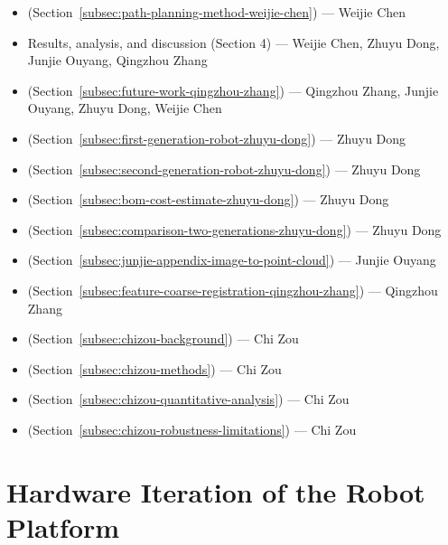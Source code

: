 \documentclass[12pt]{interim_report}
\begin{document}
\begin{itemize}
    \item {} (Section~\ref{subsec:path-planning-method-weijie-chen}) --- Weijie Chen
    \item Results, analysis, and discussion (Section 4) --- Weijie Chen, Zhuyu Dong, Junjie Ouyang, Qingzhou Zhang
    \item {} (Section~\ref{subsec:future-work-qingzhou-zhang}) --- Qingzhou Zhang, Junjie Ouyang, Zhuyu Dong, Weijie Chen
    \item {} (Section~\ref{subsec:first-generation-robot-zhuyu-dong}) --- Zhuyu Dong
    \item {} (Section~\ref{subsec:second-generation-robot-zhuyu-dong}) --- Zhuyu Dong
    \item {} (Section~\ref{subsec:bom-cost-estimate-zhuyu-dong}) --- Zhuyu Dong
    \item {} (Section~\ref{subsec:comparison-two-generations-zhuyu-dong}) --- Zhuyu Dong
    \item {} (Section~\ref{subsec:junjie-appendix-image-to-point-cloud}) --- Junjie Ouyang
    \item {} (Section~\ref{subsec:feature-coarse-registration-qingzhou-zhang}) --- Qingzhou Zhang
    \item {} (Section~\ref{subsec:chizou-background}) --- Chi Zou
    \item {} (Section~\ref{subsec:chizou-methods}) --- Chi Zou
    \item {} (Section~\ref{subsec:chizou-quantitative-analysis}) --- Chi Zou
    \item {} (Section~\ref{subsec:chizou-robustness-limitations}) --- Chi Zou
\end{itemize}






\appendix
\section{Hardware Iteration of the Robot Platform}
\label{app:hardware-iteration}
\end{document}
